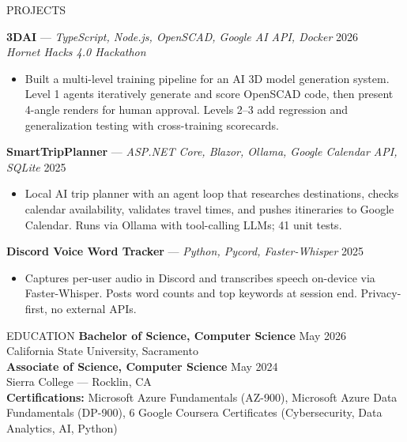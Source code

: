 \documentclass{resume}
\begin{document}

\begin{rSection}{PROJECTS}

\textbf{3DAI} --- \textit{TypeScript, Node.js, OpenSCAD, Google AI API, Docker} \hfill 2026 \\
\textit{Hornet Hacks 4.0 Hackathon}
\begin{itemize}
    \item Built a multi-level training pipeline for an AI 3D model generation system. Level 1 agents iteratively generate and score OpenSCAD code, then present 4-angle renders for human approval. Levels 2--3 add regression and generalization testing with cross-training scorecards.
\end{itemize}

\textbf{SmartTripPlanner} --- \textit{ASP.NET Core, Blazor, Ollama, Google Calendar API, SQLite} \hfill 2025
\begin{itemize}
    \item Local AI trip planner with an agent loop that researches destinations, checks calendar availability, validates travel times, and pushes itineraries to Google Calendar. Runs via Ollama with tool-calling LLMs; 41 unit tests.
\end{itemize}

\textbf{Discord Voice Word Tracker} --- \textit{Python, Pycord, Faster-Whisper} \hfill 2025
\begin{itemize}
    \item Captures per-user audio in Discord and transcribes speech on-device via Faster-Whisper. Posts word counts and top keywords at session end. Privacy-first, no external APIs.
\end{itemize}

\end{rSection}


\begin{rSection}{EDUCATION}
\textbf{Bachelor of Science, Computer Science} \hfill May 2026 \\
California State University, Sacramento \\

\textbf{Associate of Science, Computer Science} \hfill May 2024 \\
Sierra College --- Rocklin, CA \\

\textbf{Certifications:} Microsoft Azure Fundamentals (AZ-900), Microsoft Azure Data Fundamentals (DP-900), 6 Google Coursera Certificates (Cybersecurity, Data Analytics, AI, Python)
\end{rSection}
\end{document}
